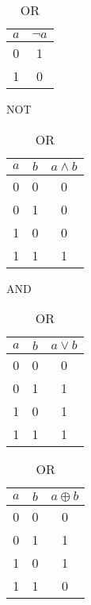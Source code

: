     \begin{table}[ht]
        \centering
        \begin{subtable}{0.2\textwidth}
            \centering
            \begin{tabular}{c|c}\hline
                \(a\) & \(\neg a\)\\\hline
                0 & 1\\
                1 & 0\\\hline
            \end{tabular}
            \caption{NOT}
        \end{subtable}
        \begin{subtable}{0.2\textwidth}
            \centering
            \begin{tabular}{cc|c}\hline
                \(a\) & \(b\) & \(a \wedge b\)\\\hline
                0 & 0 & 0\\
                0 & 1 & 0\\
                1 & 0 & 0\\
                1 & 1 & 1\\\hline
            \end{tabular}
            \caption{AND}
        \end{subtable}
        \begin{subtable}{0.2\textwidth}
            \centering
            \begin{tabular}{cc|c}\hline
                \(a\) & \(b\) & \(a \vee b\)\\\hline
                0 & 0 & 0\\
                0 & 1 & 1\\
                1 & 0 & 1\\
                1 & 1 & 1\\\hline
            \end{tabular}
            \caption{OR}
        \end{subtable}
        \begin{subtable}{0.2\textwidth}
            \centering
            \begin{tabular}{cc|c}\hline
                \(a\) & \(b\) & \(a \oplus b\)\\\hline
                0 & 0 & 0\\
                0 & 1 & 1\\
                1 & 0 & 1\\
                1 & 1 & 0\\\hline

\end{tabular}
\end{subtable}
\end{table}
